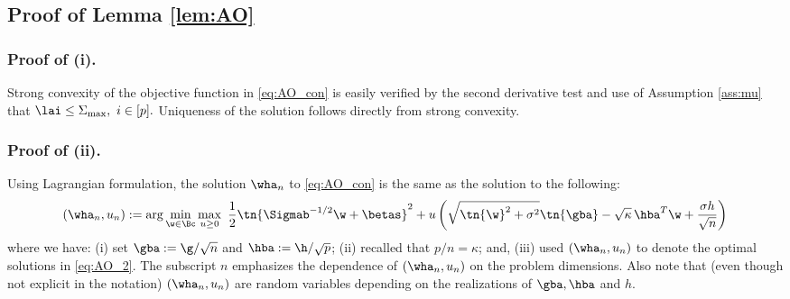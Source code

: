 


\subsection{Proof of Lemma \ref{lem:AO}}\label{sec:proofAO}


\vp

\subsubsection{Proof of (i).} Strong convexity of the objective function in \eqref{eq:AO_con} is easily verified by the second derivative test and use of Assumption \ref{ass:mu} that $\lai\leq\Sigma_{\max},~i\in[p].$ Uniqueness of the solution follows directly from strong convexity. 



\vspace{5pt}
\subsubsection{Proof of (ii).}Using Lagrangian formulation, the solution $\wha_n$ to \eqref{eq:AO_con} is the same as the solution to the following:
\begin{align}
\left(\wha_n,u_n\right) :=\arg\min_{\w\in\Bc}\max_{u\geq 0} ~\frac{1}{2}\tn{\Sigmab^{-1/2}\w+\betas}^2 + u \left( \sqrt{\tn{\w}^2+\sigma^2} \tn{\gba} - \sqrt{\kappa}\,\hba^T\w + \frac{\sigma h}{\sqrt{n}} \right)\label{eq:AO_2}
\end{align}
where we have: (i) set $\gba := \g/\sqrt{n}$ and $\hba:= \h/\sqrt{p}$; (ii) recalled that $p/n=\kappa$; and, (iii) used $\left(\wha_n,u_n\right)$ to denote the optimal solutions in \eqref{eq:AO_2}. The subscript $n$ emphasizes the dependence of $\left(\wha_n,u_n\right)$ on the problem dimensions. Also note that (even though not explicit in the notation) $\left(\wha_n,u_n\right)$ are random variables depending on the realizations of $\gba,\hba$ and $h$.

